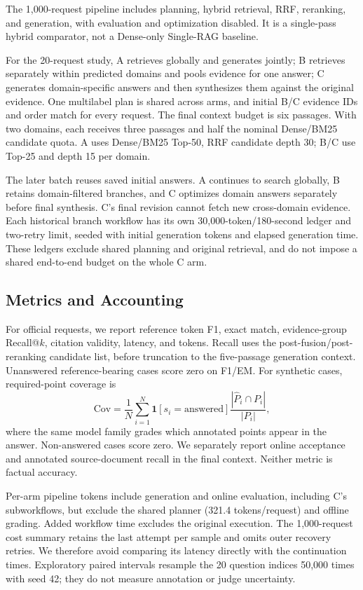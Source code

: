 The 1,000-request pipeline includes planning, hybrid retrieval, RRF, reranking, and generation, with evaluation and optimization disabled. It is a single-pass hybrid comparator, not a Dense-only Single-RAG baseline.

For the 20-request study, A retrieves globally and generates jointly; B retrieves separately within predicted domains and pools evidence for one answer; C generates domain-specific answers and then synthesizes them against the original evidence. One multilabel plan is shared across arms, and initial B/C evidence IDs and order match for every request. The final context budget is six passages. With two domains, each receives three passages and half the nominal Dense/BM25 candidate quota. A uses Dense/BM25 Top-50, RRF candidate depth 30; B/C use Top-25 and depth 15 per domain.

The later batch reuses saved initial answers. A continues to search globally, B retains domain-filtered branches, and C optimizes domain answers separately before final synthesis. C's final revision cannot fetch new cross-domain evidence. Each historical branch workflow has its own 30,000-token/180-second ledger and two-retry limit, seeded with initial generation tokens and elapsed generation time. These ledgers exclude shared planning and original retrieval, and do not impose a shared end-to-end budget on the whole C arm.

\subsection{Metrics and Accounting}
For official requests, we report reference token F1, exact match, evidence-group Recall@$k$, citation validity, latency, and tokens. Recall uses the post-fusion/post-reranking candidate list, before truncation to the five-passage generation context. Unanswered reference-bearing cases score zero on F1/EM. For synthetic cases, required-point coverage is
\begin{equation}
 \mathrm{Cov}=\frac{1}{N}\sum_{i=1}^{N}
 \mathbf{1}[s_i=\mathrm{answered}]
 \frac{|\widehat{P}_i\cap P_i|}{|P_i|},
\end{equation}
where the same model family grades which annotated points appear in the answer. Non-answered cases score zero. We separately report online acceptance and annotated source-document recall in the final context. Neither metric is factual accuracy.

Per-arm pipeline tokens include generation and online evaluation, including C's subworkflows, but exclude the shared planner (321.4 tokens/request) and offline grading. Added workflow time excludes the original execution. The 1,000-request cost summary retains the last attempt per sample and omits outer recovery retries. We therefore avoid comparing its latency directly with the continuation times. Exploratory paired intervals resample the 20 question indices 50,000 times with seed 42; they do not measure annotation or judge uncertainty.
